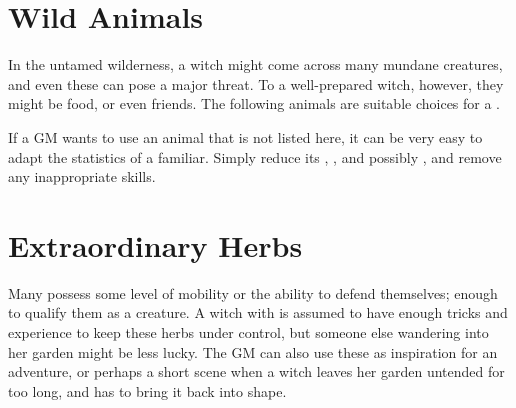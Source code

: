 \section{Wild Animals}

In the untamed wilderness, a witch might come across many mundane creatures, and even these can pose a major threat.
To a well-prepared witch, however, they might be food, or even friends.
The following animals are suitable choices for a .

If a GM wants to use an animal that is not listed here, it can be very easy to adapt the statistics of a familiar.
Simply reduce its , , and possibly , and remove any inappropriate skills.



\section{Extraordinary Herbs}

Many  possess some level of mobility or the ability to defend themselves; enough to qualify them as a creature.
A witch with  is assumed to have enough tricks and experience to keep these herbs under control, but someone else wandering into her garden might be less lucky.
The GM can also use these as inspiration for an adventure, or perhaps a short scene when a witch leaves her garden untended for too long, and has to bring it back into shape.

